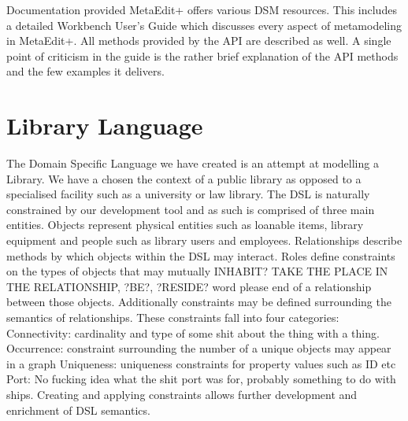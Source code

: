 \documentclass[12pt]{article}
\begin{document}
Documentation provided
MetaEdit+ offers various DSM resources. This includes a detailed Workbench User’s Guide which discusses every aspect of metamodeling in MetaEdit+. All methods provided by the API are described as well. A single point of criticism in the guide is the rather brief explanation of the API methods and the few examples it delivers.
\section{Library Language}
The Domain Specific Language we have created is an attempt at modelling a Library. We have a chosen the context of a public library as opposed to a specialised facility such as a university or law library. The DSL is naturally constrained by our development tool and as such  is comprised of three main entities. Objects represent physical entities such as loanable items, library equipment and people such as library users and employees. Relationships describe methods by which objects within the DSL may interact. Roles define constraints on the types of objects that may mutually INHABIT? TAKE THE PLACE IN THE RELATIONSHIP, ?BE?, ?RESIDE? word please  end of a relationship between those objects. Additionally constraints may be defined surrounding the semantics of relationships. These constraints fall into four categories:
Connectivity: cardinality and type of some shit about the thing with a thing. 
Occurrence: constraint surrounding the number of a unique objects may appear in a graph
Uniqueness: uniqueness constraints for property values such as ID etc
Port: No fucking idea what the shit port was for, probably something to do with ships.
Creating and applying constraints allows further development and enrichment of DSL semantics.  
\end{document}
